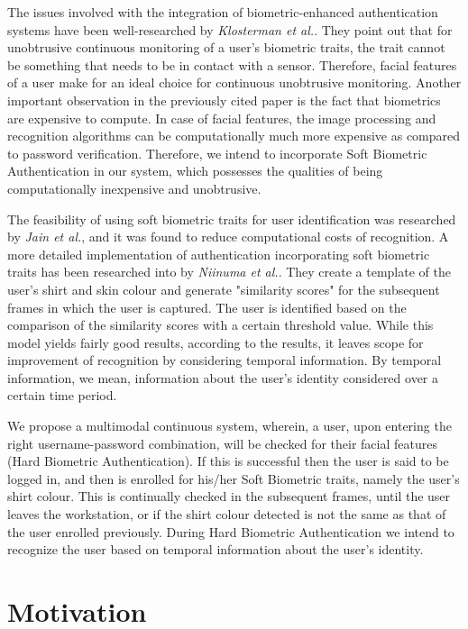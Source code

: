 \documentclass[%
        draft,
        notitlepage,
        narroweqnarray,
        inline,
        twoside,
        ]{ieee}
\begin{document}
The issues involved with the integration of biometric-enhanced authentication systems have been well-researched by \emph {Klosterman et al.}\cite{Klos00}. They point out that for unobtrusive continuous monitoring of a user's biometric traits, the trait cannot be something that needs to be in contact with a sensor. Therefore, facial features of a user make for an ideal choice for continuous unobtrusive monitoring. Another important observation in the previously cited paper is the fact that biometrics are expensive to compute. In case of facial features, the image processing and recognition algorithms can be computationally much more expensive as compared to password verification. Therefore, we intend to incorporate Soft Biometric Authentication in our system, which possesses the qualities of being computationally inexpensive and unobtrusive.

The feasibility of using soft biometric traits for user identification was researched by \emph{Jain et al.}\cite{Jain204}, and it was found to reduce computational costs of recognition. A more detailed implementation of authentication incorporating soft biometric traits has been researched into by \emph{Niinuma et al.}\cite{Niin10}. They create a template of the user's shirt and skin colour and generate "similarity scores" for the subsequent frames in which the user is captured. The user is identified based on the comparison of the similarity scores with a certain threshold value. While this model yields fairly good results, according to the results, it leaves scope for improvement of recognition by considering temporal information. By temporal information, we mean, information about the user's identity considered over a certain time period. 

We propose a multimodal continuous system, wherein, a user, upon entering the right username-password combination, will be checked for their facial features (Hard Biometric Authentication). If this is successful then the user is said to be logged in, and then is enrolled for his/her Soft Biometric traits, namely the user's shirt colour. This is continually checked in the subsequent frames, until the user leaves the workstation, or if the shirt colour detected is not the same as that of the user enrolled previously. During Hard Biometric Authentication we intend to recognize the user based on temporal information about the user's identity.

\section{Motivation}
\end{document}
